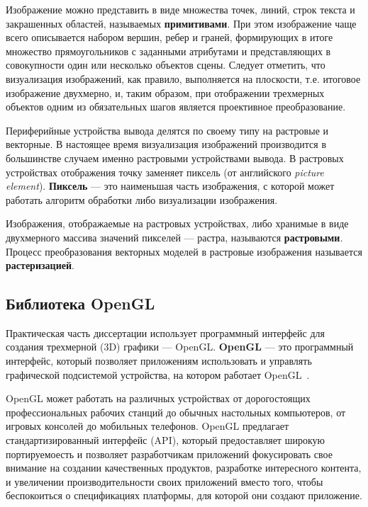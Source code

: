 Изображение можно представить в виде множества точек, линий, строк текста и
закрашенных областей, называемых \textbf{примитивами}. При этом изображение чаще
всего описывается набором вершин, ребер и граней, формирующих в итоге множество
прямоугольников с заданными атрибутами и представляющих в совокупности один или
несколько объектов сцены. Следует отметить, что визуализация изображений, как
правило, выполняется на плоскости, т\@.е\@. итоговое изображение двухмерно, и,
таким образом, при отображении трехмерных объектов одним из обязательных шагов
является проективное преобразование.

Периферийные устройства вывода делятся по своему типу на растровые и векторные.
В настоящее время визуализация изображений производится в большинстве случаем
именно растровыми устройствами вывода. В растровых устройствах отображения точку
заменяет пиксель (от английского \textit{picture element}). \textbf{Пиксель} ---
это наименьшая часть изображения, с которой может работать алгоритм обработки
либо визуализации изображения.

Изображения, отображаемые на растровых устройствах, либо хранимые в виде
двухмерного массива значений пикселей --- растра, называются
\textbf{растровыми}. Процесс преобразования векторных моделей в растровые
изображения называется \textbf{растеризацией}.

\subsection{Библиотека OpenGL}

Практическая часть диссертации использует программный интерфейс \break{}для
создания трехмерной (3D) графики --- OpenGL\@. \textbf{OpenGL} --- это
программный интерфейс, который позволяет приложениям использовать и управлять
графической подсистемой устройства, на котором работает
OpenGL~\cite{OGLSuperbible}.

OpenGL может работать на различных устройствах от дорогостоящих профессиональных
рабочих станций до обычных настольных компьютеров, от игровых консолей до
мобильных телефонов. OpenGL предлагает стандартизированный интерфейс (API),
который предоставляет широкую портируемоесть и позволяет разработчикам
приложений фокусировать свое внимание на создании качественных продуктов,
разработке интересного контента, и увеличении производительности своих
приложений вместо того, чтобы беспокоиться о спецификациях платформы, для
которой они создают приложение.

